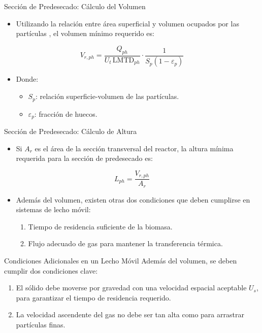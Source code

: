 \documentclass[main.tex]{subfiles}
\begin{document}
\begin{frame}{Sección de Predesecado: Cálculo del Volumen}
\small
\begin{itemize}
    \item Utilizando la relación entre área superficial y volumen ocupados por las partículas , el volumen mínimo requerido es:
\end{itemize}

\[
V_{r,ph} = \frac{Q_{ph}}{U_t \, \text{LMTD}_{ph}} \cdot \frac{1}{S_p (1 - \varepsilon_p)} 
\]

\begin{itemize}
    \item Donde:
    \begin{itemize}
        \item \( S_p \): relación superficie-volumen de las partículas.
        \item \( \varepsilon_p \): fracción de huecos.
    \end{itemize}
\end{itemize}
\end{frame}

\begin{frame}{Sección de Predesecado: Cálculo de Altura}
\small
\begin{itemize}
    \item Si \( A_r \) es el área de la sección transversal del reactor, la altura mínima requerida para la sección de predesecado es:
\end{itemize}

\[
L_{ph} = \frac{V_{r,ph}}{A_r}
\]

\begin{itemize}
    \item Además del volumen, existen otras dos condiciones que deben cumplirse en sistemas de lecho móvil:
    \begin{enumerate}
        \item Tiempo de residencia suficiente de la biomasa.
        \item Flujo adecuado de gas para mantener la transferencia térmica.
    \end{enumerate}
\end{itemize}
\end{frame}


\begin{frame}{Condiciones Adicionales en un Lecho Móvil}
  Además del volumen, se deben cumplir dos condiciones clave:

  \begin{enumerate}
    \item El sólido debe moverse por gravedad con una velocidad espacial aceptable $U_s$, para garantizar el tiempo de residencia requerido.
    \item La velocidad ascendente del gas no debe ser tan alta como para arrastrar partículas finas.
  \end{enumerate}
\end{frame}
\end{document}
